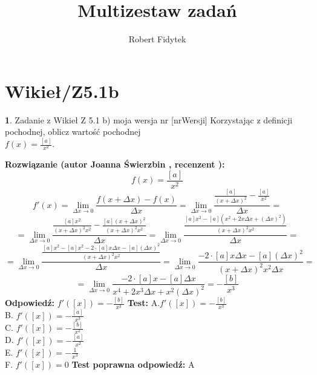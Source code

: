 \documentclass[12pt, a4paper]{article}
\title{Multizestaw zadań}
\author{Robert Fidytek}
\date{}
\theoremstyle{definition} %
\newtheorem{zad}{}
\newcommand{\kategoria}[1]{\section{#1}} %
\newcommand{\zadStart}[1]{\begin{zad}#1\newline} %
\newcommand{\zadStop}{\end{zad}}   %
\newcommand{\rozwStart}[2]{\noindent \textbf{Rozwiązanie (autor #1 , recenzent #2): }\newline} %
\newcommand{\rozwStop}{\newline}                                            %
\newcommand{\odpStart}{\noindent \textbf{Odpowiedź:}\newline}    %
\newcommand{\odpStop}{\newline}                                             %
\newcommand{\testStart}{\noindent \textbf{Test:}\newline} %
\newcommand{\testStop}{\newline} %
\newcommand{\kluczStart}{\noindent \textbf{Test poprawna odpowiedź:}\newline} %
\newcommand{\kluczStop}{\newline} %
\begin{document}
\maketitle


\kategoria{Wikieł/Z5.1b}
\zadStart{Zadanie z Wikieł Z 5.1 b) moja wersja nr [nrWersji]}
Korzystając z definicji pochodnej, oblicz wartość pochodnej \\ $f(x)=\frac{[a]}{x^2} $.
\zadStop
\rozwStart{Joanna Świerzbin}{}
$$f(x)=\frac{[a]}{x^2}$$
$$f'(x)=\lim_{\Delta x \rightarrow 0} \frac{f(x+\Delta x)-f(x)}{\Delta x} = \lim_{\Delta x \rightarrow 0} \frac{\frac{[a]}{(x+\Delta x)^2}-\frac{[a]}{x^2}}{\Delta x}= $$
$$= \lim_{\Delta x \rightarrow 0} \frac{\frac{[a]x^2}{(x+\Delta x)^2 x^2}-\frac{[a](x+\Delta x)^2}{(x+\Delta x)^2 x^2}}{\Delta x}= 
 \lim_{\Delta x \rightarrow 0} \frac{\frac{[a]x^2-[a](x^2+2x\Delta x + (\Delta x)^2)}{(x+\Delta x)^2 x^2}}{\Delta x}= $$
$$= \lim_{\Delta x \rightarrow 0} \frac{\frac{[a]x^2 -[a]x^2-2\cdot[a]x\Delta x -[a] (\Delta x)^2}{(x+\Delta x)^2 x^2}}{\Delta x}= 
\lim_{\Delta x \rightarrow 0} \frac{-2\cdot[a]x \Delta x -[a](\Delta x)^2}{(x+\Delta x)^2 x^2 \Delta x}= $$
$$= \lim_{\Delta x \rightarrow 0} \frac{-2\cdot[a]x-[a]\Delta x}{x^4 +2x^3\Delta x +x^2(\Delta x)^2}=  -\frac{[b]}{x^3}$$
\rozwStop
\odpStart
$f'([x])= -\frac{[b]}{x^3}$
\odpStop
\testStart
A.$f'([x])= -\frac{[b]}{x^3}$\\
B. $f'([x])= -\frac{[a]}{x^3}$ \\
C. $f'([x])= -\frac{[b]}{x^2}$  \\
D. $f'([x])= -\frac{[a]}{x^2}$\\
E. $f'([x])= -\frac{1}{x^3}$\\
F. $f'([x])= 0 $
\testStop
\kluczStart
A
\kluczStop
\end{document}
